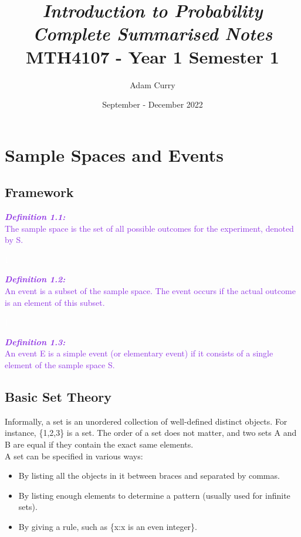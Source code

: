 \documentclass{report}
\title{\huge{\textbf{\textit{Introduction to Probability}}}\\
\Large\textbf{\textit{Complete Summarised Notes}}\\
MTH4107 - Year 1 Semester 1}
\author{Adam Curry}
\date{September - December 2022}
\newenvironment{cframed}[1][BlueViolet]
  {\begin{tcolorbox}[colframe=#1,colback=white]}
  {\end{tcolorbox}}
\begin{document}
\maketitle

\tableofcontents

\chapter{Sample Spaces and Events}
\section{Framework}

\begin{cframed}\textcolor{BlueViolet}{
\textit{\textbf{Definition 1.1:}}\\
The sample space is the set of all possible outcomes for the experiment, denoted by S.}
\end{cframed}

\textcolor{White}{1}

\begin{cframed}\textcolor{BlueViolet}{
\textit{\textbf{Definition 1.2:}}\\
An event is a subset of the sample space. The event occurs if the actual outcome is an element of this subset.}
\end{cframed}

\textcolor{White}{1}

\begin{cframed}\textcolor{BlueViolet}{
\textit{\textbf{Definition 1.3:}}\\
An event E is a simple event (or elementary event) if it consists of a single element of the sample space S.}
\end{cframed}
\section{Basic Set Theory}

Informally, a set is an unordered collection of well-defined distinct objects. For instance, \{1,2,3\} is a set. The order of a set does not matter, and two sets A and B are equal if they contain the exact same elements.\\

A set can be specified in various ways:
\begin{itemize}
    \item By listing all the objects in it between braces and separated by commas.
    \item By listing enough elements to determine a pattern (usually used for infinite sets).
    \item By giving a rule, such as \{x:x is an even integer\}. \\
\end{itemize}
\end{document}
